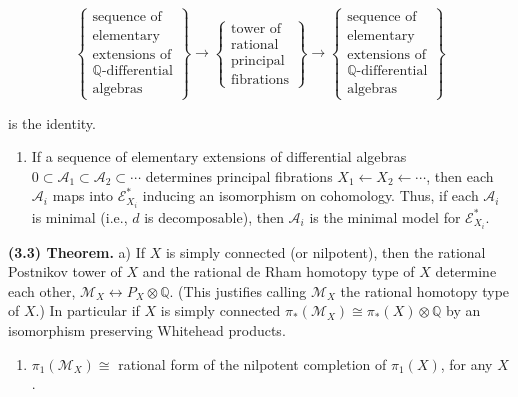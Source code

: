 \documentclass[
  english,
  a3paper,
  a3paper]{extarticle}
\providecommand{\tightlist}{%
  \setlength{\itemsep}{0pt}\setlength{\parskip}{0pt}}
\begin{document}
\[\left\{\begin{array}{c}\text{sequence of}\\\text{elementary}\\\text{extensions of}\\\mathbb Q\text{-differential}\\\text{algebras}\end{array}\right\}\longrightarrow\left\{\begin{array}{c}\text{tower of}\\\text{rational}\\\text{principal}\\\text{fibrations}\end{array}\right\}\longrightarrow\left\{\begin{array}{c}\text{sequence of}\\\text{elementary}\\\text{extensions of}\\\mathbb Q\text{-differential}\\\text{algebras}\end{array}\right\}\]

is the identity.

\begin{enumerate}
\def\labelenumi{\arabic{enumi})}
\setcounter{enumi}{2}
\tightlist
\item
  If a sequence of elementary extensions of differential algebras
  \(0\subset\mathcal A_1\subset\mathcal A_2\subset\cdots\) determines
  principal fibrations \(X_1\leftarrow X_2\leftarrow\cdots\), then each
  \(\mathcal A_i\) maps into \(\mathcal E_{X_i}^*\) inducing an
  isomorphism on cohomology. Thus, if each \(\mathcal A_i\) is minimal
  (i.e., \(d\) is decomposable), then \(\mathcal A_i\) is the minimal
  model for \(\mathcal E_{X_i}^*\).
\end{enumerate}

\textbf{(3.3) Theorem.} a) If \(X\) is simply connected (or nilpotent),
then the rational Postnikov tower of \(X\) and the rational de Rham
homotopy type of \(X\) determine each other,
\(\mathcal M_X\longleftrightarrow P_X\otimes\mathbb Q\). (This justifies
calling \(\mathcal M_X\) the rational homotopy type of \(X\).) In
particular if \(X\) is simply connected
\(\pi_*(\mathcal M_X)\cong\pi_*(X)\otimes\mathbb Q\) by an isomorphism
preserving Whitehead products.

\begin{enumerate}
\def\labelenumi{\alph{enumi})}
\setcounter{enumi}{1}
\tightlist
\item
  \(\pi_1(\mathcal M_X)\cong\) rational form of the nilpotent completion
  of \(\pi_1(X)\), for any \(X\).
\end{enumerate}
\end{document}
